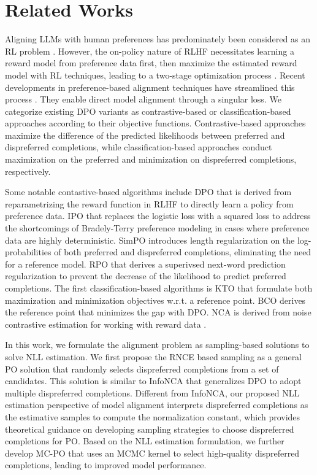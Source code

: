 \section{Related Works}
\label{sec: related works}
Aligning LLMs with human preferences has predominately been considered as an RL problem \citep{ouyang2022training}.
However,
the on-policy nature of RLHF necessitates learning a reward model from preference data first,
then maximize the estimated reward model with RL techniques,
leading to a two-stage optimization process \citep{schulman2017proximal}.
Recent developments in preference-based alignment techniques have streamlined this process \citep{rafailov2024direct,azar2024general}.
They enable direct model alignment through a singular loss.
We categorize existing DPO variants as contrastive-based or classification-based approaches according to their objective functions.
Contrastive-based approaches maximize the difference of the predicted likelihoods between preferred and dispreferred completions,
while classification-based approaches conduct maximization on the preferred and minimization on dispreferred completions, respectively.

Some notable contastive-based algorithms include 
DPO \citep{rafailov2024direct}
that is derived from reparametrizing the reward function in RLHF to directly learn a policy from preference data.
IPO \citep{azar2024general} that replaces the logistic loss with a squared loss to address the shortcomings of Bradely-Terry preference modeling in cases where preference data are highly deterministic.
SimPO \citep{meng2024simpo} introduces length regularization on the log-probabilities of both preferred and dispreferred completions, eliminating the need for a reference model. 
RPO \citep{liu2024provably} that derives a superivsed next-word prediction regularization to prevent the decrease of the likelihood to predict preferred completions.
The first classification-based algorithms is
KTO \citep{ethayarajh2024kto} that formulate both maximization and minimization objectives w.r.t. a reference point.
BCO \citep{jung2024binary}
derives the reference point that minimizes the gap with DPO.
NCA \citep{chen2024noise} is derived from noise contrastive estimation for working with reward data \citep{gutmann2010noise}.

In this work, we formulate the alignment problem as sampling-based solutions to solve NLL estimation. 
We first propose the RNCE based sampling as a general PO solution that randomly selects dispreferred completions from a set of candidates.
This solution is similar to InfoNCA \citep{chen2024noise} that generalizes DPO to adopt multiple dispreferred completions. 
Different from InfoNCA, our proposed NLL estimation perspective of model alignment interprets dispreferred completions as the estimative samples to compute the normalization constant, which provides theoretical guidance on developing sampling strategies to choose dispreferred completions for PO.
Based on the NLL estimation formulation, we further develop MC-PO that uses an MCMC kernel to select high-quality dispreferred completions, leading to improved model performance.